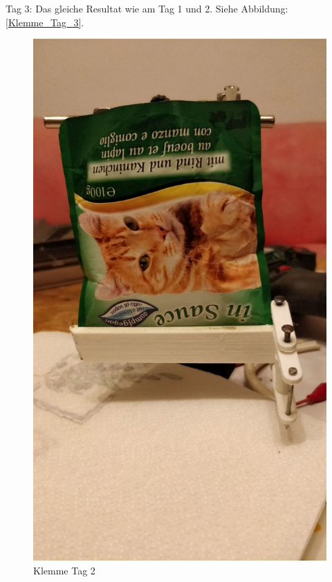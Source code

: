 Tag 3: Das gleiche Resultat wie am Tag 1 und 2. Siehe Abbildung: \ref{Klemme_Tag_3}.

\begin{figure}[H]
   \begin{minipage}[hbt]{.3\linewidth} %
      \includegraphics[width=\linewidth]{Bilder/Dichtheitsexperiment/Tag_2}
      \caption{Klemme Tag 2}
      \label{Klemme_Tag_2} 
   \end{minipage}
   \hspace{.3\linewidth}%

\end{figure}
